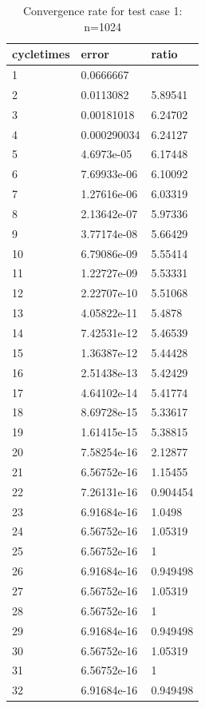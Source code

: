 \documentclass[UTF8]{ctexart}
\theoremstyle{plain}
\theoremstyle{definition}
\theoremstyle{remark}
\begin{document}
\begin{table}[H]
\centering
\begin{tabular}{|l|l|l|}
\hline
cycletimes & error & ratio\\\hline
1 & 0.0666667&\\ \hline
2 & 0.0113082& 5.89541\\ \hline
3 & 0.00181018& 6.24702\\ \hline
4 & 0.000290034& 6.24127\\ \hline
5 & 4.6973e-05& 6.17448\\ \hline
6 & 7.69933e-06& 6.10092\\ \hline
7 & 1.27616e-06& 6.03319\\ \hline
8 & 2.13642e-07& 5.97336\\ \hline
9 & 3.77174e-08& 5.66429\\ \hline
10 & 6.79086e-09& 5.55414\\ \hline
11 & 1.22727e-09& 5.53331\\ \hline
12 & 2.22707e-10& 5.51068\\ \hline
13 & 4.05822e-11& 5.4878\\ \hline
14 & 7.42531e-12& 5.46539\\ \hline
15 & 1.36387e-12& 5.44428\\ \hline
16 & 2.51438e-13& 5.42429\\ \hline
17 & 4.64102e-14& 5.41774\\ \hline
18 & 8.69728e-15& 5.33617\\ \hline
19 & 1.61415e-15& 5.38815\\ \hline
20 & 7.58254e-16& 2.12877\\ \hline
21 & 6.56752e-16& 1.15455\\ \hline
22 & 7.26131e-16& 0.904454\\ \hline
23 & 6.91684e-16& 1.0498\\ \hline
24 & 6.56752e-16& 1.05319\\ \hline
25 & 6.56752e-16& 1\\ \hline
26 & 6.91684e-16& 0.949498\\ \hline
27 & 6.56752e-16& 1.05319\\ \hline
28 & 6.56752e-16& 1\\ \hline
29 & 6.91684e-16& 0.949498\\ \hline
30 & 6.56752e-16& 1.05319\\ \hline
31 & 6.56752e-16& 1\\ \hline
32 & 6.91684e-16& 0.949498\\ \hline
\end{tabular}
\caption{Convergence rate for test case 1: n=1024}
\end{table}
\end{document}
